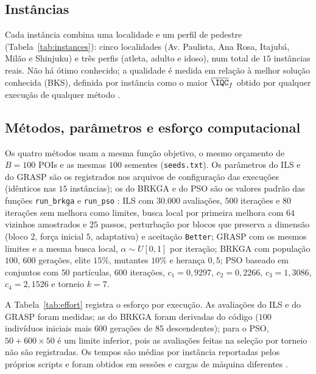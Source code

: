 \subsection{Instâncias}

Cada instância combina uma localidade e um perfil de pedestre (Tabela~\ref{tab:instances}):
cinco localidades (Av. Paulista, Ana Rosa, Itajubá, Milão e Shinjuku) e três perfis (atleta,
adulto e idoso), num total de $15$ instâncias reais. Não há ótimo conhecido; a qualidade é medida
em relação à melhor solução conhecida (BKS), definida por instância como o maior
$\overline{\IQC}_f$ obtido por qualquer execução de qualquer método \cite[Sec.~4.3]{beiranvand2017best}.



\subsection{Métodos, parâmetros e esforço computacional}

Os quatro métodos usam a mesma função objetivo, o mesmo orçamento de $B=100$ POIs e as mesmas
$100$ sementes (\texttt{seeds.txt}). Os parâmetros do ILS e do GRASP são os registrados nos arquivos de configuração
das execuções (idênticos nas $15$ instâncias); os do BRKGA e do PSO são os valores padrão das funções
\texttt{run\_brkga} e \texttt{run\_pso} :
ILS com $30.000$ avaliações, $500$ iterações e $80$ iterações sem melhora como limites,
busca local por primeira melhora com $64$ vizinhos amostrados e $25$ passos, perturbação por blocos
que preserva a dimensão (bloco $2$, força inicial $5$, adaptativa) e aceitação \texttt{Better};
GRASP com os mesmos limites e a mesma busca local, $\alpha\sim U[0,1]$ por iteração;
BRKGA com população $100$, $600$ gerações, elite $15\%$, mutantes $10\%$ e herança $0{,}5$;
PSO baseado em conjuntos com $50$ partículas, $600$ iterações, $c_1=0{,}9297$, $c_2=0{,}2266$,
$c_3=1{,}3086$, $c_4=2{,}1526$ e torneio $k=7$.

A Tabela~\ref{tab:effort} registra o esforço por execução. As avaliações do ILS e do GRASP foram
medidas; as do BRKGA foram derivadas do código ($100$ indivíduos iniciais mais $600$ gerações de
$85$ descendentes); para o PSO, $50+600\times50$ é um limite inferior, pois as avaliações feitas na
seleção por torneio não são registradas. Os tempos são médias por instância reportadas pelos
próprios scripts e foram obtidos em sessões e cargas de máquina diferentes
.

